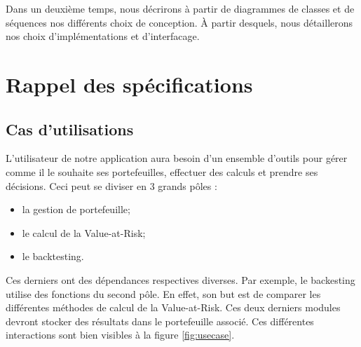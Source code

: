 \documentclass[a4paper,titlepage,french]{report}
\begin{document}
Dans un deuxième temps, nous décrirons à partir de diagrammes de classes et de séquences nos différents choix de conception.
\`A partir desquels, nous détaillerons nos choix d'implémentations et d'interfacage.


\chapter{Rappel des spécifications}

\section{Cas d'utilisations}

L'utilisateur de notre application aura besoin d'un ensemble d'outils pour gérer comme il le souhaite ses portefeuilles, effectuer des calculs et prendre ses décisions. Ceci peut se diviser en 3 grands pôles :
\begin{itemize}
\item la gestion de portefeuille;
\item le calcul de la Value-at-Risk;
\item le backtesting.
\end{itemize}
 
Ces derniers ont des dépendances respectives diverses. Par exemple, le backesting utilise des fonctions du second pôle.
En effet, son but est de comparer les différentes méthodes de calcul de la Value-at-Risk.
Ces deux derniers modules devront stocker des résultats dans le portefeuille associé.
Ces différentes interactions sont bien visibles à la figure \ref{fig:usecase}.
\end{document}
